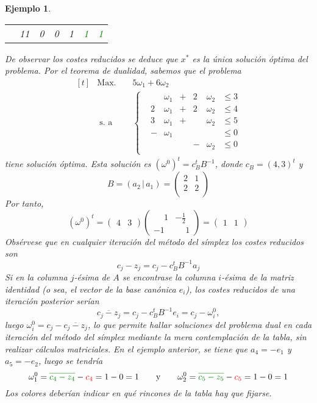 \documentclass[11pt]{report}
\theoremstyle{mytheorem}
\theoremstyle{mydefinition}
\theoremstyle{myexample}
\newtheorem*{example}{Ejemplo}
\begin{document}
\begin{example}
\begin{center}
\begin{tabular}{|c|c|c|c|c|c|c|}
    \multicolumn{1}{c|}{} & 11 & \multicolumn{1}{c}{0} & \multicolumn{1}{c}{0} & \multicolumn{1}{c}{\phantom{-}1} & \multicolumn{1}{c}{\phantom{-}\textcolor{Green}{1}} & \multicolumn{1}{c|}{\phantom{-}\textcolor{Green}{1}} \\ \cline{2-7}
\end{tabular}
\end{center}
De observar los costes reducidos se deduce que $x^*$ es la única solución óptima del problema. Por el teorema de dualidad, sabemos que el problema
\[\begin{aligned}[t]
&\text{Max. } && 5\omega_1+6\omega_2 \\
& \; \text{s. a} &&\left\{\begin{alignedat}{10}
& &\omega_1 & {}+{} & 2&\omega_2 & {}\leq{} 3 \\
&2&\omega_1 & {}+{} & 2&\omega_2 & {}\leq{} 4 \\
&3&\omega_1 & {}+{} &  &\omega_2 & {}\leq{} 5 \\
&-&\omega_1 &       &  &         & {}\leq{} 0 \\
& &         &       & -&\omega_2 & {}\leq{} 0 \\
\end{alignedat}\right.
\end{aligned}\] 
tiene solución óptima. Esta solución es $(\omega^0)^t = c_B^tB^{-1}$, donde $c_B = (4,3)^t$ y
\[B = (a_2 \, | \, a_1) = \begin{pmatrix}
    2 & 1 \\
    2 & 2 \\
\end{pmatrix}\]
Por tanto,
\[(\omega^0)^t = \begin{pmatrix}
    4 & 3
\end{pmatrix} \begin{pmatrix}
    \phantom{-}1 & -\frac{1}{2} \\
    -1 & \phantom{-}1
\end{pmatrix} = \begin{pmatrix}
    1 & 1
\end{pmatrix}\]
Obsérvese que en cualquier iteración del método del símplex los costes reducidos son
\[c_j-z_j = c_j-c_B^tB^{-1}a_j\]
Si en la columna $j$-ésima de $A$ se encontrase la columna $i$-ésima de la matriz identidad (o sea, el vector de la base canónica $e_i$), los costes reducidos de una iteración posterior serían
\[\overline{c_j-z_j} = c_j-c_B^tB^{-1}e_i = c_j-\omega^0_i,\]
luego $\omega^0_i = c_j -\overline{c_j-z_j}$, lo que permite hallar soluciones del problema dual en cada iteración del método del símplex mediante la mera contemplación de la tabla, sin realizar cálculos matriciales. En el ejemplo anterior, se tiene que $a_4 = -e_1$ y $a_5 = -e_2$, luego se tendría
\[\omega^0_1 = \textcolor{Green}{\overline{c_4-z_4}}-\textcolor{Red}{c_4} = 1-0=1 \qquad \textup{y} \qquad \omega^0_2 = \textcolor{Green}{\overline{c_5-z_5}}-\textcolor{Red}{c_5} =1-0=1\]
Los colores deberían indicar en qué rincones de la tabla hay que fijarse.
\end{example}
\end{document}
